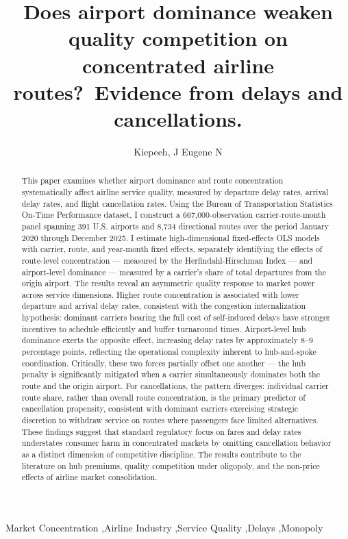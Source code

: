 \documentclass[preprint,12pt,authoryear]{elsarticle}
\begin{document}
\begin{frontmatter}

\title{\textbf{Does airport dominance weaken quality competition on concentrated airline routes?}\ 
Evidence from delays and cancellations.}

\author[inst1]{Kiepeeh, J Eugene N}

\begin{abstract}
    This paper examines whether airport dominance and route concentration systematically affect airline service quality, measured by departure delay rates, arrival delay rates, and flight cancellation rates. Using the Bureau of Transportation Statistics On-Time Performance dataset, I construct a 667,000-observation carrier-route-month panel spanning 391 U.S. airports and 8,734 directional routes over the period January 2020 through December 2025. I estimate high-dimensional fixed-effects OLS models with carrier, route, and year-month fixed effects, separately identifying the effects of route-level concentration — measured by the Herfindahl-Hirschman Index — and airport-level dominance — measured by a carrier's share of total departures from the origin airport. The results reveal an asymmetric quality response to market power across service dimensions. Higher route concentration is associated with lower departure and arrival delay rates, consistent with the congestion internalization hypothesis: dominant carriers bearing the full cost of self-induced delays have stronger incentives to schedule efficiently and buffer turnaround times. Airport-level hub dominance exerts the opposite effect, increasing delay rates by approximately 8–9 percentage points, reflecting the operational complexity inherent to hub-and-spoke coordination. Critically, these two forces partially offset one another — the hub penalty is significantly mitigated when a carrier simultaneously dominates both the route and the origin airport. For cancellations, the pattern diverges: individual carrier route share, rather than overall route concentration, is the primary predictor of cancellation propensity, consistent with dominant carriers exercising strategic discretion to withdraw service on routes where passengers face limited alternatives. These findings suggest that standard regulatory focus on fares and delay rates understates consumer harm in concentrated markets by omitting cancellation behavior as a distinct dimension of competitive discipline. The results contribute to the literature on hub premiums, quality competition under oligopoly, and the non-price effects of airline market consolidation.
\end{abstract}

\begin{keyword}
Market Concentration \sep Airline Industry \sep Service Quality \sep Delays \sep Monopoly
\end{keyword}

\end{frontmatter}
\end{document}
